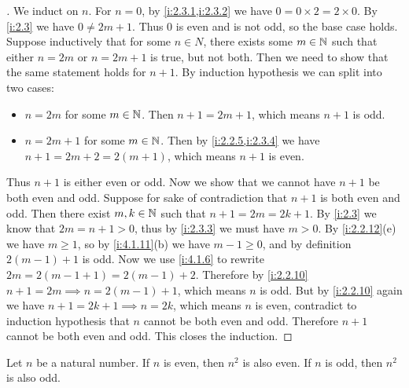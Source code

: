 \begin{proof}[]
  We induct on \(n\).
  For \(n = 0\), by \cref{i:2.3.1,i:2.3.2} we have \(0 = 0 \times 2 = 2 \times 0\).
  By \cref{i:2.3} we have \(0 \neq 2m + 1\).
  Thus \(0\) is even and is not odd, so the base case holds.
  Suppose inductively that for some \(n \in N\), there exists some \(m \in \mathbb{N}\) such that either \(n = 2m\) or \(n = 2m + 1\) is true, but not both.
  Then we need to show that the same statement holds for \(n + 1\).
  By induction hypothesis we can split into two cases:
  \begin{itemize}
    \item \(n = 2m\) for some \(m \in \mathbb{N}\).
          Then \(n + 1 = 2m + 1\), which means \(n + 1\) is odd.
    \item \(n = 2m + 1\) for some \(m \in \mathbb{N}\).
          Then by \cref{i:2.2.5,i:2.3.4} we have \(n + 1 = 2m + 2 = 2(m + 1)\), which means \(n + 1\) is even.
  \end{itemize}
  Thus \(n + 1\) is either even or odd.
  Now we show that we cannot have \(n + 1\) be both even and odd.
  Suppose for sake of contradiction that \(n + 1\) is both even and odd.
  Then there exist \(m, k \in \mathbb{N}\) such that \(n + 1 = 2m = 2k + 1\).
  By \cref{i:2.3} we know that \(2m = n + 1 > 0\), thus by \cref{i:2.3.3} we must have \(m > 0\).
  By \cref{i:2.2.12}(e) we have \(m \geq 1\), so by \cref{i:4.1.11}(b) we have \(m - 1 \geq 0\), and by definition \(2(m - 1) + 1\) is odd.
  Now we use \cref{i:4.1.6} to rewrite \(2m = 2 (m - 1 + 1) = 2 (m - 1) + 2\).
  Therefore by \cref{i:2.2.10} \(n + 1 = 2m \implies n = 2 (m - 1) + 1\), which means \(n\) is odd.
  But by \cref{i:2.2.10} again we have \(n + 1 = 2k + 1 \implies n = 2k\), which means \(n\) is even, contradict to induction hypothesis that \(n\) cannot be both even and odd.
  Therefore \(n + 1\) cannot be both even and odd.
  This closes the induction.
\end{proof}

\begin{ac}\label{i:ac:4.4.3}
  Let \(n\) be a natural number.
  If \(n\) is even, then \(n^2\) is also even.
  If \(n\) is odd, then \(n^2\) is also odd.
\end{ac}

